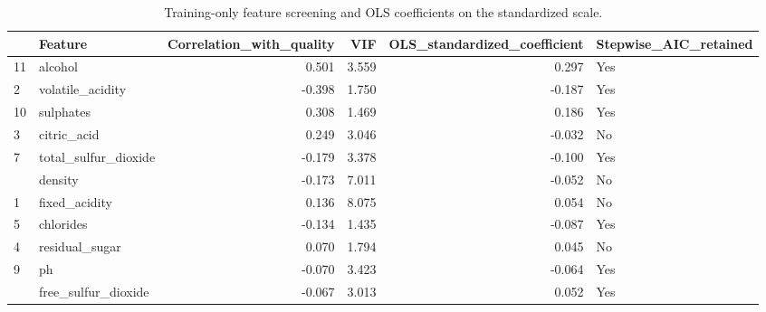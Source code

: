 \begin{table}

\caption{\label{tab:p3-feature-screening}Training-only feature screening and OLS coefficients on the standardized scale.}
\centering
\begin{tabular}[t]{llrrrl}
\toprule
  & Feature & Correlation\_with\_quality & VIF & OLS\_standardized\_coefficient & Stepwise\_AIC\_retained\\
\midrule
11 & alcohol & 0.501 & 3.559 & 0.297 & Yes\\
2 & volatile\_acidity & -0.398 & 1.750 & -0.187 & Yes\\
10 & sulphates & 0.308 & 1.469 & 0.186 & Yes\\
3 & citric\_acid & 0.249 & 3.046 & -0.032 & No\\
7 & total\_sulfur\_dioxide & -0.179 & 3.378 & -0.100 & Yes\\
\addlinespace
8 & density & -0.173 & 7.011 & -0.052 & No\\
1 & fixed\_acidity & 0.136 & 8.075 & 0.054 & No\\
5 & chlorides & -0.134 & 1.435 & -0.087 & Yes\\
4 & residual\_sugar & 0.070 & 1.794 & 0.045 & No\\
9 & ph & -0.070 & 3.423 & -0.064 & Yes\\
\addlinespace
6 & free\_sulfur\_dioxide & -0.067 & 3.013 & 0.052 & Yes\\
\bottomrule
\end{tabular}
\end{table}
